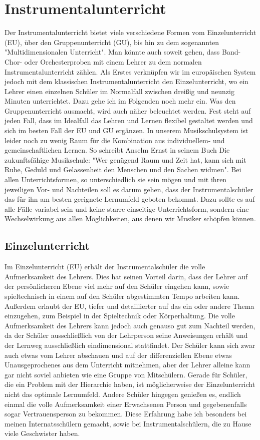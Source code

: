 \section{Instrumentalunterricht}
Der Instrumentalunterricht bietet viele verschiedene Formen vom Einzelunterricht (EU),
über den Gruppenunterricht (GU), bis hin zu dem sogenannten "Multidimensionalen
Unterricht". Man könnte auch soweit gehen, dass Band- Chor- oder Orchesterproben
mit einem Lehrer zu dem normalen Instrumentalunterricht zählen. Als Erstes
verknüpfen wir im europäischen System jedoch mit dem klassischen
Instrumentalunterricht den Einzelunterricht, wo ein Lehrer einen einzelnen
Schüler im Normalfall zwischen dreißig und neunzig Minuten unterrichtet. Dazu
gehe ich im Folgenden noch mehr ein. Was den Gruppenunterricht ausmacht, wird
auch näher beleuchtet werden. Fest steht auf jeden Fall, dass im Idealfall das
Lehren und Lernen flexibel gestaltet werden und sich im besten Fall der EU und
GU ergänzen. In unserem Musikschulsystem ist leider noch zu wenig Raum für die
Kombination aus individuellem- und gemeinschaftlichen Lernen. So schreibt Anselm
Ernst in seinem Buch Die zukunftsfähige Musikschule: "Wer genügend Raum und
Zeit hat, kann sich mit Ruhe, Geduld und Gelassenheit den Menschen und den
Sachen widmen". \autocite[84]{ernst:die_zukunftsfaehige_musikschule}
Bei allen Unterrichtsformen, so unterschiedlich sie sein mögen und mit ihren
jeweiligen Vor- und Nachteilen soll es darum gehen, dass der Instrumentalschüler
das für ihn am besten geeignete Lernumfeld geboten bekommt. Dazu sollte es auf
alle Fälle variabel sein und keine starre einseitige Unterrichtsform, sondern
eine Wechselwirkung aus allen Möglichkeiten, aus denen wir Musiker schöpfen
können. 


\subsection{Einzelunterricht}
Im Einzelunterricht (EU) erhält der Instrumentalschüler die volle Aufmerksamkeit des
Lehrers. Dies hat seinen Vorteil darin, dass der Lehrer auf der persönlicheren
Ebene viel mehr auf den Schüler eingehen kann, sowie spieltechnisch in einem auf
den Schüler abgestimmten Tempo arbeiten kann. Außerdem erlaubt der EU, tiefer
und detaillierter auf das ein oder andere Thema einzugehen, zum Beispiel in der
Spieltechnik oder Körperhaltung. Die volle Aufmerksamkeit des Lehrers kann jedoch auch genauso gut
zum Nachteil werden, da der Schüler ausschließlich von der Lehrperson seine
Anweisungen erhält und der Lernweg ausschließlich eindimensional stattfindet.
Der Schüler kann sich zwar auch etwas vom Lehrer abschauen und auf der
differenziellen Ebene etwas Unausgeprochenes aus dem Unterricht mitnehmen, aber
der Lehrer alleine kann gar nicht soviel anbieten wie eine Gruppe von
Mitschülern. Gerade für Schüler, die ein Problem mit der Hierarchie haben, ist
möglicherweise der Einzelunterricht nicht das optimale Lernumfeld. Andere
Schüler hingegen genießen es, endlich einmal die volle Aufmerksamkeit einer
Erwachsenen Person und gegebenenfalls sogar Vertrauensperson zu bekommen. Diese
Erfahrung habe ich besonders bei meinen Internatsschülern gemacht, sowie bei
Instrumentalschülern, die zu Hause viele Geschwister haben. 

